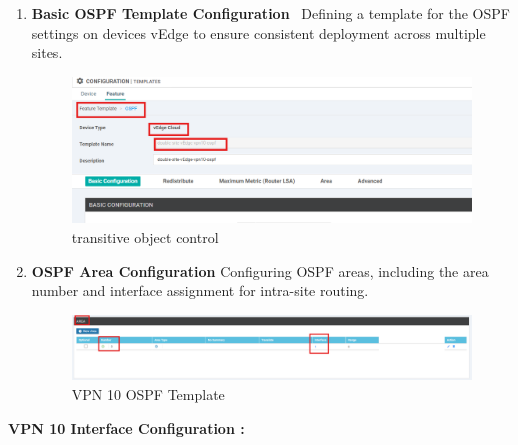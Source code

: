 \documentclass[12pt,english]{report}
\begin{document}
\begin{enumerate}
    \item \textbf{Basic OSPF Template Configuration} \
    Defining a template for the OSPF settings on devices vEdge to ensure consistent deployment across multiple sites.
\begin{figure}[H]
    \centering
    \includegraphics[width= 1 \textwidth]{chapitre 3/template/11.png}
    \caption{transitive object control}
    \label{transitive object control}
\end{figure}
    \item \textbf{OSPF Area Configuration}
    Configuring OSPF areas, including the area number and interface assignment for intra-site routing.
\begin{figure}[H]
    \centering
    \includegraphics[width= 1 \textwidth]{chapitre 3/template/11.5.png}
    \caption{VPN 10 OSPF Template}
    \label{VPN 10 OSPF Template}
\end{figure}
\end{enumerate}
\textbf{VPN 10 Interface Configuration :}
\end{document}
